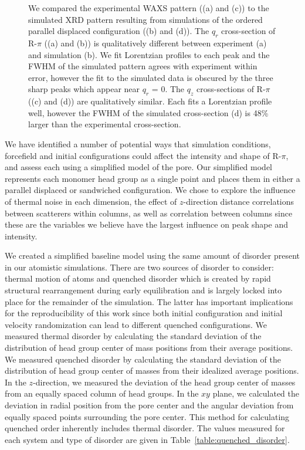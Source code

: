\documentclass[journal=jpcbfk,manuscript=article]{achemso}
\begin{document}
\begin{figure}
{  We compared the experimental WAXS pattern ((a) and (c)) to the simulated XRD
  pattern resulting from simulations of the ordered parallel displaced 
  configuration ((b) and (d)). The $q_r$ cross-section of R-$\pi$ ((a) and (b))
  is qualitatively different between experiment (a) and simulation (b). We fit
  Lorentzian profiles to each peak and the FWHM of the simulated pattern agrees
  with experiment within error, however the fit to the simulated data is 
  obscured by the three sharp peaks which appear near $q_r$ = 0. The $q_z$ 
  cross-sections of R-$\pi$ ((c) and (d)) are qualitatively similar. Each fits
  a Lorentzian profile well, however the FWHM of the simulated cross-section (d)
  is 48\% larger than the experimental cross-section.}\label{fig:rpi_exp_comparison}
  \end{figure}
  
  We have identified a number of potential ways that simulation conditions,
  forcefield and initial configurations could affect the intensity and shape of
  R-$\pi$, and assess each using a simplified model of the pore. Our simplified model 
  represents each monomer head group as a single point and places them in either
  a parallel displaced or sandwiched configuration. We chose to explore the 
  influence of thermal noise in each dimension, the effect of $z$-direction 
  distance correlations between scatterers within columns, as well as correlation
  between columns since these are the variables we believe have the largest 
  influence on peak shape and intensity.
  
  We created a simplified baseline model using the same amount of
  disorder present in our atomistic simulations. There are two sources of
  disorder to consider: thermal motion of atoms and quenched disorder which is
  created by rapid structural rearrangement during early equilibration and 
  is largely locked into place for the remainder of the simulation. The latter
  has important implications 
for the reproducibility of this work since both 
  initial configuration and initial velocity randomization can lead to 
  different quenched configurations. We measured thermal disorder by
  calculating the standard deviation of the distribution of head group center 
  of mass positions from their average positions. We measured quenched 
  disorder by calculating the standard deviation of the distribution of head
  group center of masses from their idealized average positions. In the 
  $z$-direction, we measured the deviation of the head group center of masses
  from an equally spaced column of head groups. In the $xy$ plane, we 
  calculated the deviation in radial position from the pore center and the
  angular deviation from equally spaced points surrounding the pore center.
  This method for calculating quenched order inherently includes thermal 
  disorder. The values measured for each system and type of disorder are given
  in Table~\ref{table:quenched_disorder}.
\end{document}

